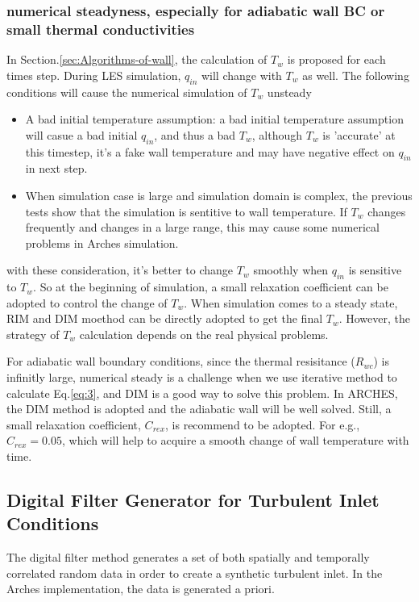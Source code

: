 \subsubsection{numerical steadyness, especially for adiabatic wall BC or small thermal
conductivities}

In Section.\ref{sec:Algorithms-of-wall}, the calculation of $T_w$
is proposed for each times step. During LES simulation, $q_{in}$
will change with $T_w$ as well. The following conditions will cause
the numerical simulation of $T_w$ unsteady
\begin{itemize}
\item A bad initial temperature assumption: a bad initial temperature assumption
will casue a bad initial $q_{in}$, and thus a bad $T_w$, although
$T_w$ is 'accurate' at this timestep, it's a fake wall temperature
and may have negative effect on $q_{in}$ in next step.
\item When simulation case is large and simulation domain is complex, the
previous tests show that the simulation is sentitive to wall temperature.
If $T_w$ changes frequently and changes in a large range, this may
cause some numerical problems in Arches simulation. 
\end{itemize}
with these consideration, it's better to change $T_w$ smoothly when
$q_{in}$ is sensitive to $T_w$. So at the beginning of simulation,
a small relaxation coefficient can be adopted to control the change
of $T_w$. When simulation comes to a steady state, RIM and DIM moethod
can be directly adopted to get the final $T_w$. However, the strategy
of $T_w$ calculation depends on the real physical problems. 

For adiabatic wall boundary conditions, since the thermal resisitance
($R_{wc}$) is infinitly large, numerical steady is a challenge when
we use iterative method to calculate Eq.\ref{eq:3}, and DIM is a
good way to solve this problem. In ARCHES, the DIM method is adopted
and the adiabatic wall will be well solved. Still, a small relaxation
coefficient, $C_{rex}$, is recommend to be adopted. For e.g., $C_{rex}=0.05$,
which will help to acquire a smooth change of wall temperature with
time.






\subsection{Digital Filter Generator for Turbulent Inlet Conditions}\label{sec:DFG}
The digital filter method generates a set of both spatially and temporally correlated random data in order to create a synthetic turbulent inlet.  In the Arches implementation, the data is generated a priori.

